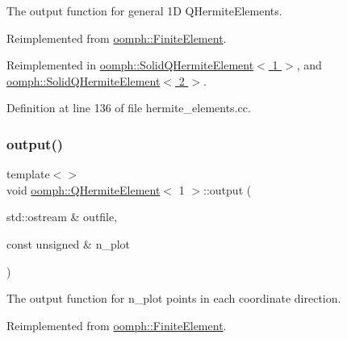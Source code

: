 The output function for general 1D Q\+Hermite\+Elements. 



Reimplemented from \hyperlink{classoomph_1_1FiniteElement_a2ad98a3d2ef4999f1bef62c0ff13f2a7}{oomph\+::\+Finite\+Element}.



Reimplemented in \hyperlink{classoomph_1_1SolidQHermiteElement_a6459f239b585ae575d779f58f70bae46}{oomph\+::\+Solid\+Q\+Hermite\+Element$<$ 1 $>$}, and \hyperlink{classoomph_1_1SolidQHermiteElement_a6459f239b585ae575d779f58f70bae46}{oomph\+::\+Solid\+Q\+Hermite\+Element$<$ 2 $>$}.



Definition at line 136 of file hermite\+\_\+elements.\+cc.

\mbox{\label{classoomph_1_1QHermiteElement_a1b31b1c4c9ebff1debdf069dc8fa976d}} 
\subsubsection{\texorpdfstring{output()}{output()}\hspace{0.1cm}{\footnotesize\ttfamily [2/12]}}
{\footnotesize\ttfamily template$<$$>$ \\
void \hyperlink{classoomph_1_1QHermiteElement}{oomph\+::\+Q\+Hermite\+Element}$<$ 1 $>$\+::output (\begin{DoxyParamCaption}\item[{std\+::ostream \&}]{outfile,  }\item[{const unsigned \&}]{n\+\_\+plot }\end{DoxyParamCaption})\hspace{0.3cm}{\ttfamily [virtual]}}



The output function for n\+\_\+plot points in each coordinate direction. 



Reimplemented from \hyperlink{classoomph_1_1FiniteElement_afa9d9b2670f999b43e6679c9dd28c457}{oomph\+::\+Finite\+Element}.



